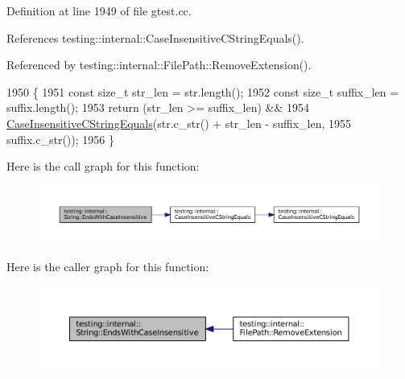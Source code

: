 Definition at line 1949 of file gtest.\+cc.



References testing\+::internal\+::\+Case\+Insensitive\+C\+String\+Equals().



Referenced by testing\+::internal\+::\+File\+Path\+::\+Remove\+Extension().


\begin{DoxyCode}
1950                                                    \{
1951   \textcolor{keyword}{const} \textcolor{keywordtype}{size\_t} str\_len = str.length();
1952   \textcolor{keyword}{const} \textcolor{keywordtype}{size\_t} suffix\_len = suffix.length();
1953   \textcolor{keywordflow}{return} (str\_len >= suffix\_len) &&
1954          \hyperlink{classtesting_1_1internal_1_1String_a116ca435d63306927ba19f90a3596787}{CaseInsensitiveCStringEquals}(str.c\_str() + str\_len - suffix\_len,
1955                                       suffix.c\_str());
1956 \}
\end{DoxyCode}
Here is the call graph for this function\+:
\nopagebreak
\begin{figure}[H]
\begin{center}
\leavevmode
\includegraphics[width=350pt]{classtesting_1_1internal_1_1String_a968f242b709f8c7c0ed5ecf246553321_cgraph}
\end{center}
\end{figure}
Here is the caller graph for this function\+:
\nopagebreak
\begin{figure}[H]
\begin{center}
\leavevmode
\includegraphics[width=350pt]{classtesting_1_1internal_1_1String_a968f242b709f8c7c0ed5ecf246553321_icgraph}
\end{center}
\end{figure}
\mbox{\label{classtesting_1_1internal_1_1String_af702dc7cbd569589d8e3ff215a7cafa9}} 
